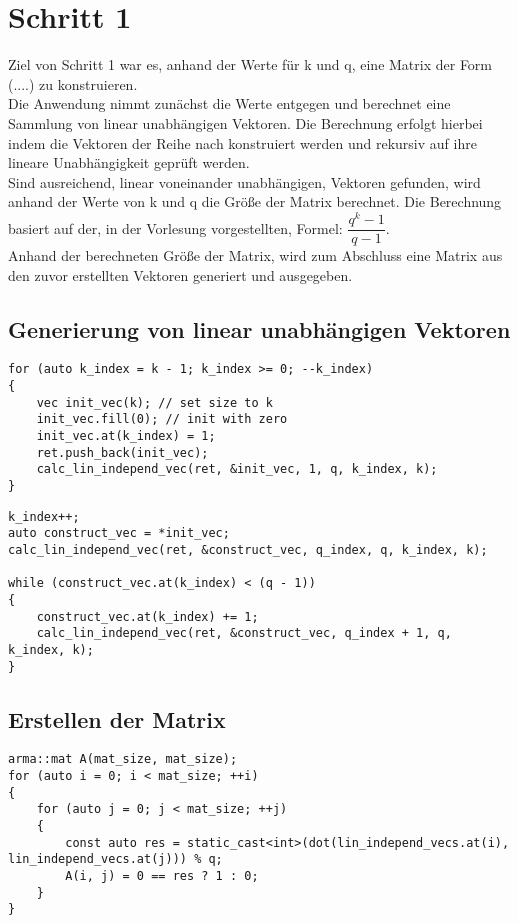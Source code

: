 \section{Schritt 1}
Ziel von Schritt 1 war es, anhand der Werte für k und q, eine Matrix der Form (....) zu konstruieren. \\
Die Anwendung nimmt zunächst die Werte  entgegen und berechnet eine Sammlung von linear unabhängigen Vektoren. Die Berechnung erfolgt hierbei indem die Vektoren der Reihe nach konstruiert werden und rekursiv auf ihre lineare Unabhängigkeit geprüft werden.\\
Sind ausreichend, linear voneinander unabhängigen, Vektoren gefunden, wird anhand der Werte von k und q die Größe der Matrix berechnet. Die Berechnung basiert auf der, in der Vorlesung vorgestellten, Formel: $\dfrac{q^{k}-1}{q-1}$. \\
Anhand der berechneten Größe der Matrix, wird zum Abschluss eine Matrix aus den zuvor erstellten Vektoren generiert und ausgegeben.
\subsection{Generierung von linear unabhängigen Vektoren}

\begin{lstlisting}[caption=Generierung der Vektoren]
for (auto k_index = k - 1; k_index >= 0; --k_index)
{
	vec init_vec(k); // set size to k
	init_vec.fill(0); // init with zero
	init_vec.at(k_index) = 1;
	ret.push_back(init_vec);
	calc_lin_independ_vec(ret, &init_vec, 1, q, k_index, k);
}	
\end{lstlisting}
\begin{lstlisting}[caption=Berechnung der linearen Unabhängigkeiten]
k_index++;
auto construct_vec = *init_vec;
calc_lin_independ_vec(ret, &construct_vec, q_index, q, k_index, k);
	
while (construct_vec.at(k_index) < (q - 1))
{
	construct_vec.at(k_index) += 1;
	calc_lin_independ_vec(ret, &construct_vec, q_index + 1, q, k_index, k);
}
\end{lstlisting}

\subsection{Erstellen der Matrix}
\begin{lstlisting}[caption=Erstellen der Generatormatrix]
arma::mat A(mat_size, mat_size);
for (auto i = 0; i < mat_size; ++i)
{
	for (auto j = 0; j < mat_size; ++j)
	{
		const auto res = static_cast<int>(dot(lin_independ_vecs.at(i), lin_independ_vecs.at(j))) % q;
		A(i, j) = 0 == res ? 1 : 0;
	}
}
\end{lstlisting}
  

